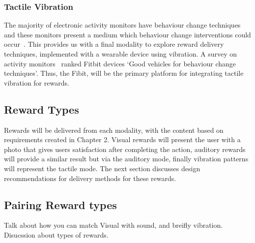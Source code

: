 \subsubsection*{Tactile Vibration}
The majority of electronic activity monitors have behaviour change techniques and these monitors present a medium which behaviour change interventions could occur~\cite{article_wearable_good}.
This provides us with a final modality to explore reward delivery techniques, implemented with a wearable device using vibration.
A survey on activity monitors~\cite{article_wearable_good} ranked Fitbit devices `Good vehicles for behaviour change techniques'.
Thus, the Fibit, will be the primary platform for integrating tactile vibration for rewards.

\subsection{Reward Types}
Rewards will be delivered from each modality, with the content based on requirements created in Chapter 2.
Visual rewards will present the user with a photo that gives users satisfaction after completing the action,
auditory rewards will provide a similar result but via the auditory mode, finally vibration patterns will represent the tactile mode.
The next section discusses design recommendations for delivery methods for these rewards.

\subsection{Pairing Reward types}

Talk about how you can match Visual with sound, and breifly vibration.
Disucssion about types of rewards.
